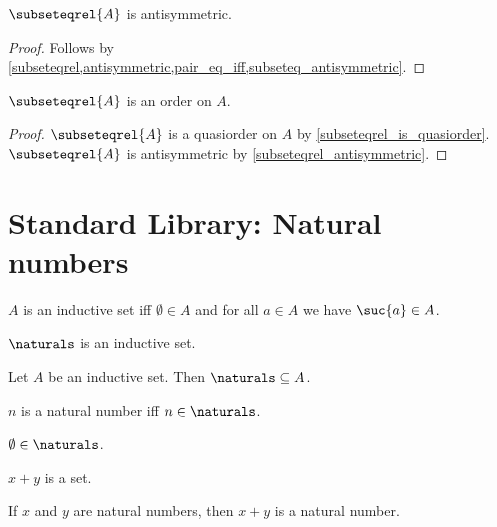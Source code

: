 \begin{proposition}\label{subseteqrel_antisymmetric}
    $\subseteqrel{A}$ is antisymmetric.
\end{proposition}
\begin{proof}
    Follows by \cref{subseteqrel,antisymmetric,pair_eq_iff,subseteq_antisymmetric}.
\end{proof}


\begin{proposition}\label{subseteqrel_is_order}
    $\subseteqrel{A}$ is an order on $A$.
\end{proposition}
\begin{proof}
    $\subseteqrel{A}$ is a quasiorder on $A$ by \cref{subseteqrel_is_quasiorder}.
    $\subseteqrel{A}$ is antisymmetric by \cref{subseteqrel_antisymmetric}.
\end{proof}


\section{Standard Library: Natural numbers}

\begin{abbreviation}\label{num_inductive_set}
    $A$ is an inductive set iff $\emptyset\in A$ and for all $a\in A$ we have $\suc{a}\in A$.
\end{abbreviation}

\begin{axiom}\label{num_naturals_inductive_set}
    $\naturals$ is an inductive set.
\end{axiom}

\begin{axiom}\label{num_naturals_smallest_inductive_set}
    Let $A$ be an inductive set.
    Then $\naturals\subseteq A$.
\end{axiom}

\begin{abbreviation}\label{num_naturalnumber}
    $n$ is a natural number iff $n\in \naturals$.
\end{abbreviation}

\begin{lemma}\label{num_emptyset_in_naturals}
    $\emptyset\in\naturals$.    
\end{lemma}

\begin{signature}\label{num_addition_is_set}
    $x+y$ is a set.
\end{signature}

\begin{axiom}\label{num_addition_on_naturals}
    If $x$ and $y$ are natural numbers, then $x + y$ is a natural number.
\end{axiom}

